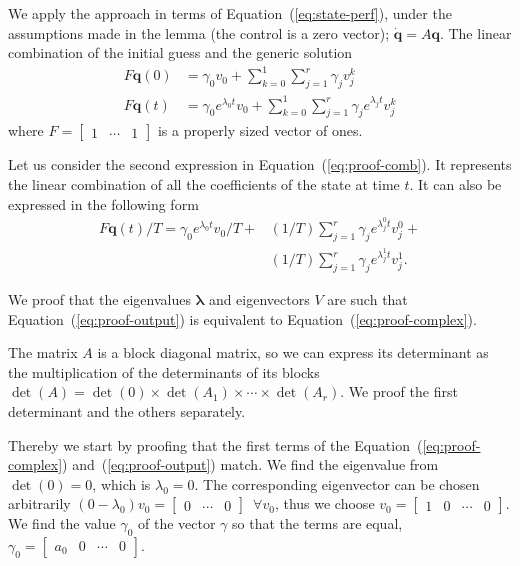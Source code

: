 \documentclass[letterpaper,10pt,conference]{ieeeconf}
\theoremstyle{definition}
\begin{document}
We apply the approach in terms of Equation~(\ref{eq:state-perf}), under the assumptions made in the lemma (the control is a zero vector); $\dot{\mathbf{q}}=A\mathbf{q}$. The linear combination of the initial guess and the generic solution
\begin{equation}\label{eq:proof-comb}\begin{split}
  F\mathbf{q}(0)&=\gamma_0 v_0+\sum_{k=0}^{1}{\sum_{j=1}^{r}{\gamma_j v_j^k}}\\
  F\mathbf{q}(t)&=\gamma_0 e^{\lambda_0 t} v_0+\sum_{k=0}^{1}{\sum_{j=1}^{r}{\gamma_j e^{\lambda_j t} v_j^k}}
\end{split}\end{equation}
where $F=\begin{bmatrix}1 & \cdots & 1\end{bmatrix}$ is a properly sized vector of ones. 

Let us consider the second expression in Equation~(\ref{eq:proof-comb}). It represents the linear combination of all the coefficients of the state at time $t$. It can also be expressed in the following form
\begin{equation}\label{eq:proof-output}\begin{split}
  F\mathbf{q}(t)/T=\gamma_0 e^{\lambda_0t}v_0/T+&(1/T)\sum_{j=1}^r{\gamma_j e^{\lambda_j^0t}v_j^0}+\\&(1/T)\sum_{j=1}^r{\gamma_j e^{\lambda_j^1t}v_j^1}.
\end{split}\end{equation}

We proof that the eigenvalues $\mathbf{\lambda}$ and eigenvectors $V$ are such that Equation~(\ref{eq:proof-output}) is equivalent to Equation~(\ref{eq:proof-complex}).

The matrix $A$ is a block diagonal matrix, so we can express its determinant as the multiplication of the determinants of its blocks $\det{(A)}=\det{(0)}\times\det{(A_1)}\times\cdots\times\det{(A_r)}$. We proof the first determinant and the others separately.

Thereby we start by proofing that the first terms of the Equation~(\ref{eq:proof-complex}) and~(\ref{eq:proof-output}) match. We find the eigenvalue from $\det(0)=0$, which is $\lambda_0=0$. The corresponding eigenvector can be chosen arbitrarily $(0-\lambda_0)v_0=\begin{bmatrix} 0 & \cdots & 0 \end{bmatrix}\,\,\,\forall v_0$, thus we choose $v_0=\begin{bmatrix}1 & 0 & \cdots & 0\end{bmatrix}$. We find the value $\gamma_0$ of the vector $\gamma$ so that the terms are equal, $\gamma_0=\begin{bmatrix}a_0 & 0 & \cdots & 0\end{bmatrix}$. 
\end{document}

